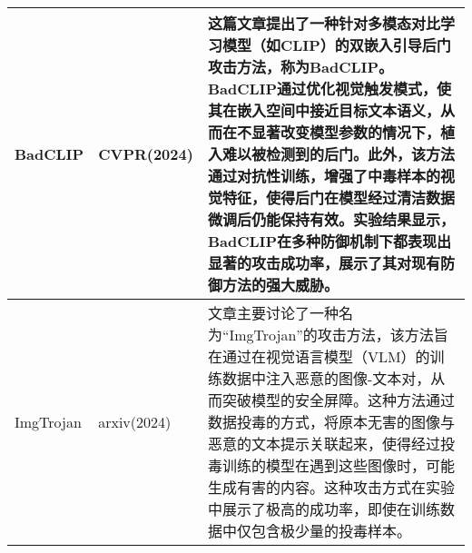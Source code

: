 \documentclass[lettersize,journal]{IEEEtran}
\begin{document}
\begin{longtable}{|p{3.5cm}|p{2cm}|p{10.5cm}|}
   BadCLIP\cite{liang2024badclip} & CVPR(2024) & 这篇文章提出了一种针对多模态对比学习模型（如CLIP）的双嵌入引导后门攻击方法，称为BadCLIP。BadCLIP通过优化视觉触发模式，使其在嵌入空间中接近目标文本语义，从而在不显著改变模型参数的情况下，植入难以被检测到的后门。此外，该方法通过对抗性训练，增强了中毒样本的视觉特征，使得后门在模型经过清洁数据微调后仍能保持有效。实验结果显示，BadCLIP在多种防御机制下都表现出显著的攻击成功率，展示了其对现有防御方法的强大威胁。\\ \hline
   ImgTrojan\cite{tao2024imgtrojan} & arxiv(2024) & 文章主要讨论了一种名为“ImgTrojan”的攻击方法，该方法旨在通过在视觉语言模型（VLM）的训练数据中注入恶意的图像-文本对，从而突破模型的安全屏障。这种方法通过数据投毒的方式，将原本无害的图像与恶意的文本提示关联起来，使得经过投毒训练的模型在遇到这些图像时，可能生成有害的内容。这种攻击方式在实验中展示了极高的成功率，即使在训练数据中仅包含极少量的投毒样本。 \\ \hline

\end{longtable}
\end{document}
